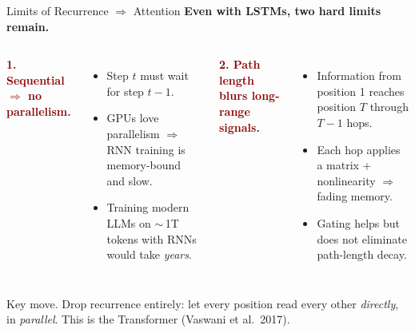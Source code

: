 \documentclass[aspectratio=169,11pt]{beamer}
\newcommand{\emphc}[1]{\textcolor{harvardcrimson}{#1}}
\begin{document}
\begin{frame}{Limits of Recurrence $\Rightarrow$ Attention}
\footnotesize
\textbf{Even with LSTMs, two hard limits remain.}

\vspace{3pt}
\begin{columns}[T]
\textcolor{darkred}{\textbf{1. Sequential $\Rightarrow$ no parallelism.}}
\begin{itemize}\itemsep0pt
    \item Step $t$ must wait for step $t{-}1$.
    \item GPUs love parallelism $\Rightarrow$ RNN training is memory-bound and slow.
    \item Training modern LLMs on $\sim$\,1T tokens with RNNs would take \emph{years}.
\end{itemize}

\textcolor{darkred}{\textbf{2. Path length blurs long-range signals.}}
\begin{itemize}\itemsep0pt
    \item Information from position 1 reaches position $T$ through $T{-}1$ hops.
    \item Each hop applies a matrix + nonlinearity $\Rightarrow$ fading memory.
    \item Gating helps but does not eliminate path-length decay.
\end{itemize}
\end{columns}

\vspace{6pt}
\begin{center}
\end{center}

\vspace{2pt}
{\scriptsize\emphc{Key move.}  Drop recurrence entirely: let every position read every other \emph{directly}, in \emph{parallel}.  This is the \emphc{Transformer} (Vaswani et al.\ 2017).}
\end{frame}
\end{document}
